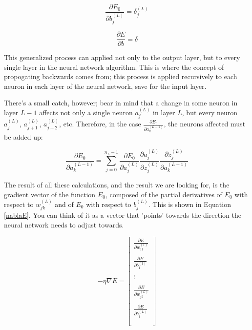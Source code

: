 \documentclass[12pt]{article}
\begin{document}
\[ \frac{\partial E_0}{\partial b_j^{(L)}} = \delta_j^{(L)}\]

\begin{equation} \label{general-delta-dEB}
    \frac{\partial E}{\partial b} = \delta
\end{equation}


This generalized process can applied not only to the output layer, but to every single layer in the neural network algorithm. This is where the concept of propogating backwards comes from; this process is applied recursively to each neuron in each layer of the neural network, save for the input layer.

There's a small catch, however; bear in mind that a change in some neuron in layer $L-1$ affects not only a single neuron $a_j^{(L)}$ in layer $L$, but every neuron $a_j^{(L)}$, $a_{j+1}^{(L)}$, $a_{j+2}^{(L)}$, etc. Therefore, in the case $ \frac{\partial E_0}{\partial a_k^{(L-1)}} $, the neurons affected must be added up:

\[ \frac{\partial E_0}{\partial a_k^{(L-1)}} = \sum_{j=0}^{n_L-1} \frac{\partial E_0}{\partial a_j^{(L)}}  \frac{\partial a_j^{(L)}}{\partial z_j^{(L)}} \frac{\partial z_j^{(L)}}{\partial a_k^{(L-1)}} \]

The result of all these calculations, and the result we are looking for, is the gradient vector of the function $E_0$, composed of the partial derivatives of $E_0$ with respect to $w_{jk}^{(L)}$ and of $E_0$ with respect to $b_j^{(L)}$. This is shown in Equation \ref{nablaE}. You can think of it as a vector that 'points' towards the direction the neural network needs to adjust towards.


\begin{equation} \label{nablaE}
    -\eta \nabla E = \begin{bmatrix}
        \frac{\partial E}{\partial w_{11}^{(1)}} \\\\
        \frac{\partial E}{\partial b_1^{(1)}}    \\\\
        \vdots                                   \\\\
        \frac{\partial E}{\partial w_{jk}^{(L)}} \\\\
        \frac{\partial E}{\partial b_j^{(L)}}    \\\\
    \end{bmatrix}
\end{equation}
\end{document}
